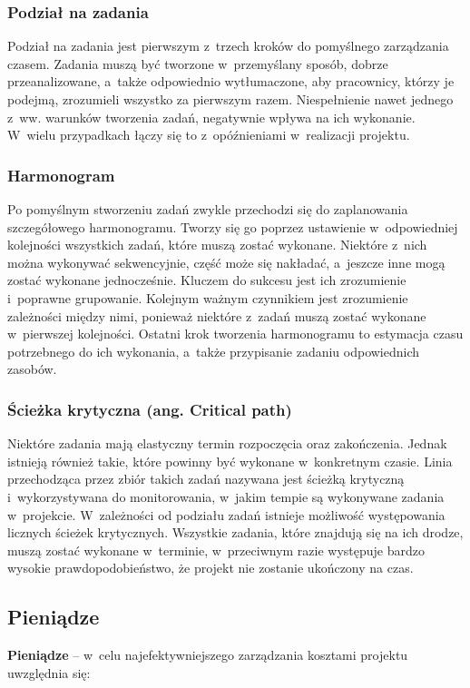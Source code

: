 \documentclass[oneside,polski,logo]{amuthesis}
\begin{document}
\subsubsection {Podział na zadania}
Podział na zadania jest pierwszym z~trzech kroków do pomyślnego zarządzania czasem. Zadania muszą być tworzone w~przemyślany sposób, dobrze przeanalizowane, a~także odpowiednio wytłumaczone, aby pracownicy, którzy je podejmą, zrozumieli wszystko za pierwszym razem. Niespełnienie nawet jednego z~ww. warunków tworzenia zadań, negatywnie wpływa na ich wykonanie. W~wielu przypadkach łączy się to z~opóźnieniami w~realizacji projektu.

\subsubsection {Harmonogram}
Po pomyślnym stworzeniu zadań zwykle przechodzi się do zaplanowania szczegółowego harmonogramu. Tworzy się go poprzez ustawienie w~odpowiedniej kolejności wszystkich zadań, które muszą zostać wykonane. Niektóre z~nich można wykonywać sekwencyjnie, część może się nakładać, a~jeszcze inne mogą zostać wykonane jednocześnie. Kluczem do sukcesu jest ich zrozumienie i~poprawne grupowanie. Kolejnym ważnym czynnikiem jest zrozumienie zależności między nimi, ponieważ niektóre z~zadań muszą zostać wykonane w~pierwszej kolejności. Ostatni krok tworzenia harmonogramu to estymacja czasu potrzebnego do ich wykonania, a~także przypisanie zadaniu odpowiednich zasobów. 

\subsubsection {Ścieżka krytyczna (ang. Critical path)}
Niektóre zadania mają elastyczny termin rozpoczęcia oraz zakończenia. Jednak istnieją również takie, które powinny być wykonane w~konkretnym czasie. Linia przechodząca przez zbiór takich zadań nazywana jest ścieżką krytyczną i~wykorzystywana do monitorowania, w~jakim tempie są wykonywane zadania w~projekcie. W~zależności od podziału zadań istnieje możliwość występowania licznych ścieżek krytycznych. Wszystkie zadania, które znajdują się na ich drodze, muszą zostać wykonane w~terminie, w~przeciwnym razie występuje bardzo wysokie prawdopodobieństwo, że projekt nie zostanie ukończony na czas.

\subsection {Pieniądze}
\textbf{Pieniądze} – w~celu najefektywniejszego zarządzania kosztami projektu uwzględnia się:
\end{document}
